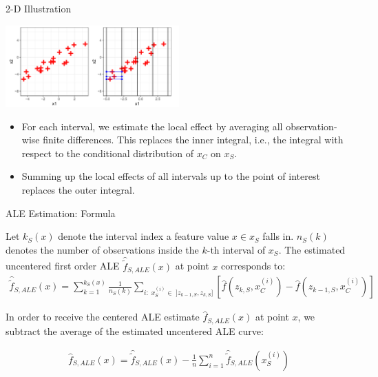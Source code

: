 \documentclass[aspectratio=169]{../latex_main/tntbeamer}  %
\begin{document}
\begin{frame}{2-D Illustration}
\vspace{-1em}
\begin{center}
\includegraphics[width=0.5\textwidth]{figure/2D01.png}
\end{center}


 \begin{itemize}
  \item For each interval, we estimate the local effect by averaging all observation-wise finite differences. This replaces the inner integral, i.e., the integral with respect to the conditional distribution of $x_C$ on $x_S$.
  \item Summing up the local effects of all intervals up to the point of interest replaces the outer integral.
\end{itemize}

\end{frame}
\begin{frame}{ALE Estimation: Formula}

Let $k_S(x)$ denote the interval index a feature value $x \in x_S$ falls in. $n_S(k)$ denotes the number of observations inside the $k$-th interval of $x_S$. The estimated uncentered first order ALE $\hat{\tilde{f}}_{S, ALE}(x)$ at point $x$ corresponds to:
$$
\begin{aligned}
\hat{\tilde{f}}_{S, ALE}(x) = \sum_{k = 1}^{k_S(x)}\frac{1}{n_S(k)}\sum_{i: \; x_S^{(i)} \in \; ]z_{k-1, S}, z_{k, S}]}\left[\hat{f}(z_{k, S}, x^{(i)}_C) -\hat{f}(z_{k-1, S}, x^{(i)}_C)\right]
\end{aligned}
$$

\pause
In order to receive the centered ALE estimate $\hat{f}_{S, ALE}(x)$ at point $x$, we subtract the average of the estimated uncentered ALE curve:

$$
\begin{aligned}
\hat{f}_{S, ALE}(x) = \hat{\tilde{f}}_{S, ALE}(x) - \frac{1}{n}\sum_{i = 1}^n \hat{\tilde{f}}_{S, ALE}(x_S^{(i)})
\end{aligned}
$$

\end{frame}
\end{document}
